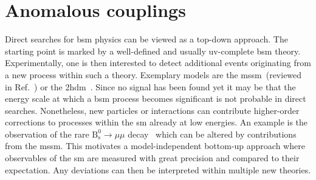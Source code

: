 

\section{Anomalous couplings}

Direct searches for \gls{bsm} physics can be viewed as a top-down approach. The starting point is marked by a well-defined and usually \gls{uv}-complete \gls{bsm} theory. Experimentally, one is then interested to detect additional events originating from a new process within such a theory. Exemplary models are the \gls{mssm}~(reviewed in Ref.~\cite{Csaki:1996ks}) or the \gls{2hdm}~\cite{Branco:2011iw}. Since no signal has been found yet it may be that the energy scale at which a \gls{bsm} process becomes significant is not probable in direct searches. Nonetheless, new particles or interactions can contribute higher-order corrections to processes within the \gls{sm} already at low energies. An example is the observation of the rare $\mathrm{B}^{0}_\mathrm{s}\to\mu\mu$ decay~\cite{CMS:2014xfa} which can be altered by contributions from the \gls{mssm}. This motivates a model-independent bottom-up approach where observables of the \gls{sm} are measured with great precision and compared to their expectation. Any deviations can then be interpreted within multiple new theories.

